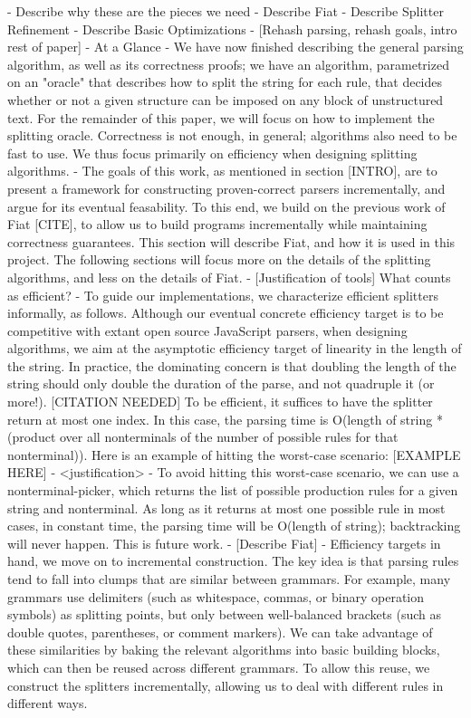     - Describe why these are the pieces we need
    - Describe Fiat
    - Describe Splitter Refinement
    - Describe Basic Optimizations
  - [Rehash parsing, rehash goals, intro rest of paper]
    - At a Glance
      - We have now finished describing the general parsing algorithm, as well as its correctness proofs; we have an algorithm, parametrized on an "oracle" that describes how to split the string for each rule, that decides whether or not a given structure can be imposed on any block of unstructured text.  For the remainder of this paper, we will focus on how to implement the splitting oracle.  Correctness is not enough, in general; algorithms also need to be fast to use.  We thus focus primarily on efficiency when designing splitting algorithms.
      - The goals of this work, as mentioned in section [INTRO], are to present a framework for constructing proven-correct parsers incrementally, and argue for its eventual feasability.  To this end, we build on the previous work of Fiat [CITE], to allow us to build programs incrementally while maintaining correctness guarantees.  This section will describe Fiat, and how it is used in this project.  The following sections will focus more on the details of the splitting algorithms, and less on the details of Fiat.
  - [Justification of tools] What counts as efficient?
    - To guide our implementations, we characterize efficient splitters informally, as follows.  Although our eventual concrete efficiency target is to be competitive with extant open source JavaScript parsers, when designing algorithms, we aim at the asymptotic efficiency target of linearity in the length of the string.  In practice, the dominating concern is that doubling the length of the string should only double the duration of the parse, and not quadruple it (or more!).  [CITATION NEEDED]  To be efficient, it suffices to have the splitter return at most one index.  In this case, the parsing time is O(length of string * (product over all nonterminals of the number of possible rules for that nonterminal)). Here is an example of hitting the worst-case scenario: [EXAMPLE HERE]
      - <justification>
    - To avoid hitting this worst-case scenario, we can use a nonterminal-picker, which returns the list of possible production rules for a given string and nonterminal.  As long as it returns at most one possible rule in most cases, in constant time, the parsing time will be O(length of string); backtracking will never happen.  This is future work.
  - [Describe Fiat]
    - Efficiency targets in hand, we move on to incremental construction.  The key idea is that parsing rules tend to fall into clumps that are similar between grammars.  For example, many grammars use delimiters (such as whitespace, commas, or binary operation symbols) as splitting points, but only between well-balanced brackets (such as double quotes, parentheses, or comment markers).  We can take advantage of these similarities by baking the relevant algorithms into basic building blocks, which can then be reused across different grammars.  To allow this reuse, we construct the splitters incrementally, allowing us to deal with different rules in different ways.

